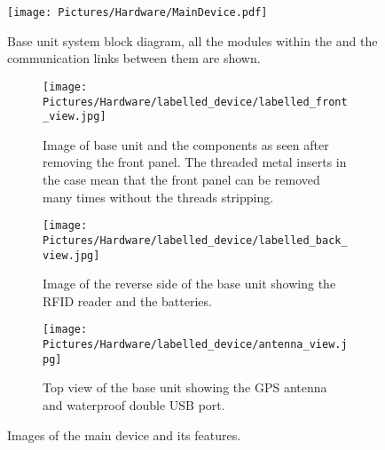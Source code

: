 \begin{figure}[h]
\centering
\texttt{[image: Pictures/Hardware/MainDevice.pdf]}
\captionsetup{justification = centering}
\caption{Base unit system block diagram, all the modules within the  and the communication links between them are shown.}
\label{fig:JM_Main}
\end{figure} 


\begin{figure} [t]
\centering
\begin{subfigure}{\linewidth}
  \centering
  \texttt{[image: Pictures/Hardware/labelled\_device/labelled\_front\_view.jpg]}
  \captionsetup{justification  = centering}
  \caption{Image of base unit and the components as seen after removing the front panel. The threaded metal inserts in the case mean that the front panel can be removed many times without the threads stripping.}
  \label{subfig:labelled_1}
\end{subfigure}
\bigskip
\begin{subfigure}{0.48\linewidth}
  \centering
  \texttt{[image: Pictures/Hardware/labelled\_device/labelled\_back\_view.jpg]}
  \captionsetup{justification  = centering}
  \caption{Image of the reverse side of the base unit showing the RFID reader and the batteries.}
  \label{subfig:labelled_2}
\end{subfigure}
\begin{subfigure}{0.48\linewidth}
  \centering
  \texttt{[image: Pictures/Hardware/labelled\_device/antenna\_view.jpg]}
  \captionsetup{justification  = centering}
  \caption{Top view of the base unit showing the GPS antenna and waterproof double \gls{USB} port.}
  \label{subfig:labelled_3}
\end{subfigure}
\caption{Images of the main device and its features.}
\label{fig:pcb}
\end{figure}




